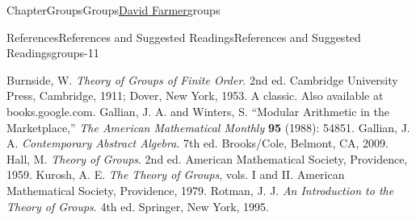 \documentclass[oneside,10pt,]{book}
\numberwithin{equation}{section}
\begin{document}
\begin{chapterptx}{Chapter}{Groups}{}{Groups}{\hyperlink{dfarmer}{David Farmer}}{}{groups}
\typeout{************************************************}
%
\begin{references-section}{References}{References and Suggested Readings}{}{References and Suggested Readings}{}{}{groups-11}
\begin{referencelist}
\hypertarget{groups-11-2}{}Burnside, W. \textit{Theory of Groups of Finite Order}. 2nd ed. Cambridge University Press, Cambridge, 1911; Dover, New York, 1953.  A classic.  Also available at books.google.com.
\hypertarget{groups-11-3}{}Gallian, J. A. and Winters, S. ``Modular Arithmetic in the Marketplace,'' \textit{The American Mathematical Monthly} \textbf{95} (1988): 548\textendash{}51.
\hypertarget{groups-11-4}{}Gallian, J. A. \textit{Contemporary Abstract Algebra}. 7th ed. Brooks\slash{}Cole, Belmont, CA, 2009.
\hypertarget{groups-11-5}{}Hall, M. \textit{Theory of Groups}. 2nd ed. American Mathematical Society, Providence, 1959.
\hypertarget{groups-11-6}{}Kurosh, A. E. \textit{The Theory of Groups}, vols. I and II. American Mathematical Society, Providence, 1979.
\hypertarget{groups-11-7}{}Rotman, J. J. \textit{An Introduction to the Theory of Groups}. 4th ed. Springer, New York, 1995.
\end{referencelist}
\end{references-section}
\end{chapterptx}
%
%
\typeout{************************************************}
\typeout{************************************************}
%
\end{document}
